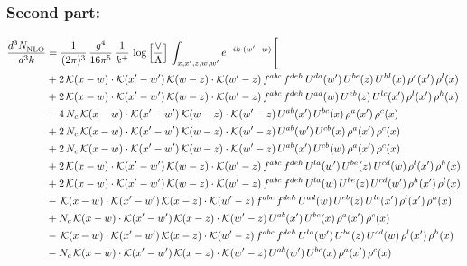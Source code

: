 \documentclass[9pt]{article}
\numberwithin{equation}{section}
\begin{document}
\subsubsection{Second part:}
\begin{align}
\frac{d^{3}N_{\rm NLO}^{\rm}}{d^{3}k}  & = \frac{1}{(2\pi)^{3}}\,\frac{g^{4}}{16\pi^{5}}\,\frac{1}{k^{+}}\,\log{\left[\frac{\vee}{\Lambda}\right]}\,\int_{x,x',z,w,w'}e^{-ik\cdot(w'-w)}\Bigg[\notag\\ &+2\,\mathcal{K}(x-w)\cdot\mathcal{K}(x'-w')\,\mathcal{K}(w-z)\cdot\mathcal{K}(w'-z)\,f^{abc}\,f^{deh}\,U^{da}(w')\,U^{be}(z)\,U^{hl}(x)\,\rho^{c}(x')\,\rho^{l}(x)\notag\\
&+2\,\mathcal{K}(x-w)\cdot\mathcal{K}(x'-w')\,\mathcal{K}(w-z)\cdot\mathcal{K}(w'-z)\,f^{abc}\,f^{deh}\,U^{ad}(w)\,U^{eb}(z)\,U^{lc}(x')\,\rho^{l}(x')\,\rho^{h}(x)\notag\\
&-4\,N_{c}\,\mathcal{K}(x-w)\cdot\mathcal{K}(x'-w')\,\mathcal{K}(w-z)\cdot\mathcal{K}(w'-z)\,U^{ab}(x')\,U^{bc}(x)\,\rho^{a}(x')\,\rho^{c}(x)\notag\\
&+2\,N_{c}\,\mathcal{K}(x-w)\cdot\mathcal{K}(x'-w')\,\mathcal{K}(w-z)\cdot\mathcal{K}(w'-z)\,U^{ab}(w')\,U^{cb}(x)\,\rho^{a}(x')\,\rho^{c}(x)\notag\\
&+2\,N_{c}\,\mathcal{K}(x-w)\cdot\mathcal{K}(x'-w')\,\mathcal{K}(w-z)\cdot\mathcal{K}(w'-z)\,U^{ab}(x')\,U^{cb}(w)\,\rho^{a}(x')\,\rho^{c}(x)\notag\\
&+2\,\mathcal{K}(x-w)\cdot\mathcal{K}(x'-w')\,\mathcal{K}(w-z)\cdot\mathcal{K}(w'-z)\,f^{abc}\,f^{deh}\,U^{la}(w')\,U^{be}(z)\,U^{cd}(w)\,\rho^{l}(x')\,\rho^{h}(x)\notag\\
&+2\,\mathcal{K}(x-w)\cdot\mathcal{K}(x'-w')\,\mathcal{K}(w-z)\cdot\mathcal{K}(w'-z)\,f^{abc}\,f^{deh}\,U^{la}(w)\,U^{be}(z)\,U^{cd}(w')\,\rho^{h}(x')\,\rho^{l}(x)\notag\\
&-\,\mathcal{K}(x-w)\cdot\mathcal{K}(x'-w')\,\mathcal{K}(x-z)\cdot\mathcal{K}(w'-z)\,f^{abc}\,f^{deh}\,U^{ad}(w)\,U^{eb}(z)\,U^{lc}(x')\,\rho^{l}(x')\,\rho^{h}(x)\notag\\
&+N_{c}\,\mathcal{K}(x-w)\cdot\mathcal{K}(x'-w')\,\mathcal{K}(x-z)\cdot\mathcal{K}(w'-z)\,U^{ab}(x')\,U^{bc}(x)\,\rho^{a}(x')\,\rho^{c}(x)\notag\\
&-\,\mathcal{K}(x-w)\cdot\mathcal{K}(x'-w')\,\mathcal{K}(x-z)\cdot\mathcal{K}(w'-z)\,f^{abc}\,f^{deh}\,U^{la}(w')\,U^{be}(z)\,U^{cd}(w)\,\rho^{l}(x')\,\rho^{h}(x)\notag\\
&-N_{c}\,\mathcal{K}(x-w)\cdot\mathcal{K}(x'-w')\,\mathcal{K}(x-z)\cdot\mathcal{K}(w'-z)\,U^{ab}(w')\,U^{bc}(x)\,\rho^{a}(x')\,\rho^{c}(x)\notag\\

\end{align}
\end{document}
